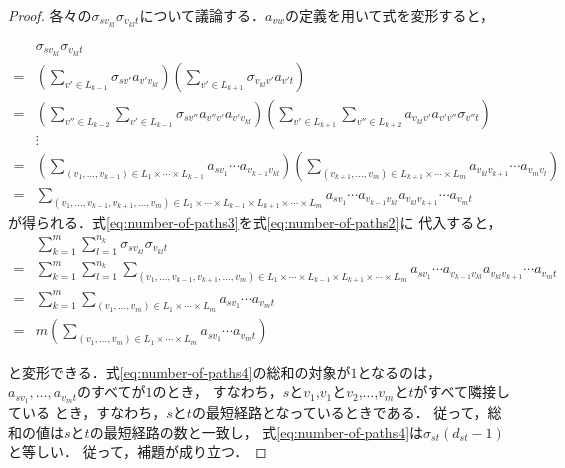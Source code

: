 \begin{proof}
  各々の$\sigma_{sv_{kl}}\sigma_{v_{kl}t}$について議論する．$a_{vw}$の定義を用いて式を変形すると，

  \begin{align}
    &\sigma_{sv_{kl}}\sigma_{v_{kl}t}\nonumber\\
    =&\left(\sum_{v'\in L_{k-1}}\sigma_{sv'}a_{v'v_{kl}}\right)
    \left(\sum_{v'\in L_{k+1}}\sigma_{v_{kl}v'}a_{v't}\right)
    \nonumber\\
    =&\left(\sum_{v''\in L_{k-2}}\sum_{v'\in L_{k-1}}
    \sigma_{sv''}a_{v''v'}a_{v'v_{kl}}\right)
    \left(\sum_{v'\in L_{k+1}}\sum_{v''\in L_{k+2}}
    a_{v_{kl}v'}a_{v'v''}\sigma_{v''t}\right)
    \nonumber\\
    &\vdots\nonumber\\
    =&\left(\sum_{(v_1,\ldots,v_{k-1})\in L_1\times\cdots\times L_{k-1}}
    a_{sv_1}\cdots a_{v_{k-1}v_{kl}}\right)
    \left(\sum_{(v_{k+1},\ldots,v_m)\in L_{k+1}\times\cdots\times L_m}
    a_{v_{kl}v_{k+1}}\cdots a_{v_mv_t}\right)\nonumber\\
    =&\sum_{(v_1,\ldots,v_{k-1},v_{k+1},\ldots,v_m)\in L_1\times\cdots\times L_{k-1}\times L_{k+1}\times\cdots\times L_m}
    a_{sv_1}\cdots a_{v_{k-1}v_{kl}}a_{v_{kl}v_{k+1}}\cdots a_{v_mt}
    \label{eq:number-of-paths3}
  \end{align}
  が得られる．式\eqref{eq:number-of-paths3}を式\eqref{eq:number-of-paths2}に
  代入すると，
  \begin{align}
    &\sum_{k=1}^m\sum_{l=1}^{n_k}\sigma_{sv_{kl}}\sigma_{v_{kl}t}\nonumber\\
    =&\sum_{k=1}^m\sum_{l=1}^{n_k}\sum_{
      (v_1,\ldots,v_{k-1},v_{k+1},\ldots,v_m)\in
      L_1\times\cdots\times L_{k-1}\times L_{k+1}\times\cdots\times L_m
    }a_{sv_1}\cdots a_{v_{k-1}v_{kl}}a_{v_{kl}v_{k+1}}\cdots a_{v_mt}\nonumber\\
    =&\sum_{k=1}^m\sum_{(v_1,\ldots,v_m)\in L_1\times\cdots\times L_m}
    a_{sv_1}\cdots a_{v_mt}\nonumber\\
    =&m\left(\sum_{(v_1,\ldots,v_m)\in L_1\times\cdots\times L_m}
    a_{sv_1}\cdots a_{v_mt}\right)
    \label{eq:number-of-paths4}
  \end{align}

  と変形できる．式\eqref{eq:number-of-paths4}の総和の対象が$1$となるのは，
  $a_{sv_1},\ldots,a_{v_mt}$のすべてが$1$のとき，
  すなわち，$s$と$v_1$,$v_1$と$v_2$,$\ldots$,$v_m$と$t$がすべて隣接している
  とき，すなわち，$s$と$t$の最短経路となっているときである．
  従って，総和の値は$s$と$t$の最短経路の数と一致し，
  式\eqref{eq:number-of-paths4}は$\sigma_{st}(d_{st}-1)$と等しい．
  従って，補題が成り立つ．
\end{proof}

